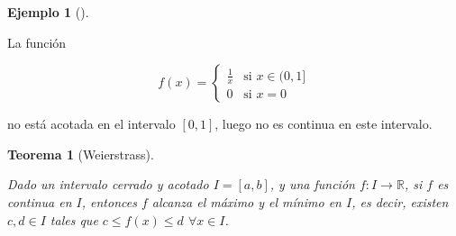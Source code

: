 \documentclass[
  a4paper,
]{scrreport}
\theoremstyle{plain}
\newtheorem{theorem}{Teorema}[chapter]
\theoremstyle{definition}
\theoremstyle{plain}
\theoremstyle{plain}
\theoremstyle{definition}
\newtheorem{example}{Ejemplo}[chapter]
\theoremstyle{definition}
\theoremstyle{remark}
\begin{document}
\begin{example}[]\protect\hypertarget{exm-función-discontinua-no-acotada}{}\label{exm-función-discontinua-no-acotada}

La función

\[
f(x)=
\begin{cases}
\frac{1}{x} & \mbox{si } x\in (0,1]\\
0 & \mbox{si } x=0
\end{cases}
\]

no está acotada en el intervalo \([0,1]\), luego no es continua en este
intervalo.

\end{example}

\begin{theorem}[Weierstrass]\protect\hypertarget{thm-weierstrass}{}\label{thm-weierstrass}

Dado un intervalo cerrado y acotado \(I=[a,b]\), y una función
\(f:I\to\mathbb{R}\), si \(f\) es continua en \(I\), entonces \(f\)
alcanza el máximo y el mínimo en \(I\), es decir, existen \(c,d\in I\)
tales que \(c\leq f(x)\leq d\) \(\forall x\in I\).

\end{theorem}
\end{document}
